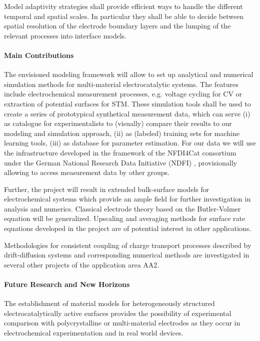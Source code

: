 \documentclass[a4paper,10pt]{article}
\begin{document}
Model adaptivity strategies shall provide efficient ways to handle the different temporal and spatial scales. %
In particular they shall be able to decide between spatial resolution of the electrode boundary layers and the lumping of the relevant processes into interface models.

\paragraph{Main Contributions}
The envisioned modeling framework will allow to set up analytical and numerical simulation methods for multi-material electrocatalytic systems. The features include electrochemical measurement processes, e.g. voltage cycling for CV or extraction of potential surfaces for STM.
These simulation tools shall be used to create a series of prototypical synthetical measurement data, which can serve (i) as catalogue for experimentalists to (visually) compare their results to our modeling and simulation approach, (ii) as (labeled)  training sets for machine learning tools,  (iii) as database for parameter estimation. For our data we will use the infrastructure developed in the framework of the NFDI4Cat consortium under the German National Research Data Initiative (NDFI) \cite{NFDI4Cat}, provisionally allowing to access measurement data by other groups.

Further, the project will result in extended bulk-surface models for electrochemical systems which provide an ample field for further investigation in analysis and numerics. 
Classical electrode theory based on the Butler-Volmer equation will be generalized.  Upscaling and averaging methods for surface rate equations developed in the project are of potential interest in other applications.

Methodologies for consistent coupling of charge transport processes described by drift-diffusion systems and
corresponding numerical methods are investigated in several other projects of the application area AA2.

\paragraph{Future Research and New Horizons}
The establishment of material models for heterogeneously structured electrocatalytically active surfaces
provides the possibility of experimental comparison with polycrystalline or  multi-material electrodes
as they occur in electrochemical experimentation and in real world devices.
\end{document}
